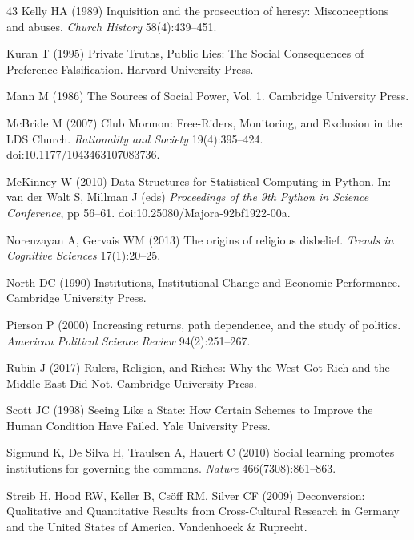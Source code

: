 \documentclass[12pt]{article}
\begin{document}
\begin{thebibliography}{43}
Kelly HA (1989) Inquisition and the prosecution of heresy: Misconceptions and abuses. \textit{Church History} 58(4):439--451.

Kuran T (1995) Private Truths, Public Lies: The Social Consequences of Preference Falsification. Harvard University Press.

Mann M (1986) The Sources of Social Power, Vol. 1. Cambridge University Press.

McBride M (2007) Club Mormon: Free-Riders, Monitoring, and Exclusion in the LDS Church. \textit{Rationality and Society} 19(4):395--424. doi:10.1177/1043463107083736.

McKinney W (2010) Data Structures for Statistical Computing in Python. In: van der Walt S, Millman J (eds) \textit{Proceedings of the 9th Python in Science Conference}, pp 56--61. doi:10.25080/Majora-92bf1922-00a.

Norenzayan A, Gervais WM (2013) The origins of religious disbelief. \textit{Trends in Cognitive Sciences} 17(1):20--25.

North DC (1990) Institutions, Institutional Change and Economic Performance. Cambridge University Press.

Pierson P (2000) Increasing returns, path dependence, and the study of politics. \textit{American Political Science Review} 94(2):251--267.

Rubin J (2017) Rulers, Religion, and Riches: Why the West Got Rich and the Middle East Did Not. Cambridge University Press.

Scott JC (1998) Seeing Like a State: How Certain Schemes to Improve the Human Condition Have Failed. Yale University Press.

Sigmund K, De Silva H, Traulsen A, Hauert C (2010) Social learning promotes institutions for governing the commons. \textit{Nature} 466(7308):861--863.

Streib H, Hood RW, Keller B, Cs\"off RM, Silver CF (2009) Deconversion: Qualitative and Quantitative Results from Cross-Cultural Research in Germany and the United States of America. Vandenhoeck \& Ruprecht.


\end{thebibliography}
\end{document}
